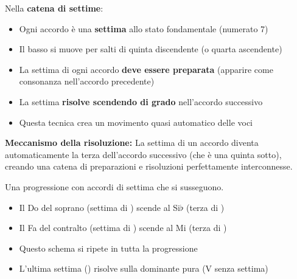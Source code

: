 \begin{regola}
	\label{reg:progressione_7}
	Nella \textbf{catena di settime}:
	
	\begin{itemize}
		\item Ogni accordo è una \textbf{settima} allo stato fondamentale (numerato 7)
		\item Il basso si muove per salti di quinta discendente (o quarta ascendente)
		\item La settima di ogni accordo \textbf{deve essere preparata} (apparire come consonanza nell'accordo precedente)
		\item La settima \textbf{risolve scendendo di grado} nell'accordo successivo
		\item Questa tecnica crea un movimento quasi automatico delle voci
	\end{itemize}
	
	\textbf{Meccanismo della risoluzione:}
	La settima di un accordo diventa automaticamente la terza dell'accordo successivo (che è una quinta sotto), creando una catena di preparazioni e risoluzioni perfettamente interconnesse.
\end{regola}

\begin{esempio}
	\label{ex:catena_settime}
	Una progressione con accordi di settima che si susseguono.
	\begin{itemize}
		\item Il Do del soprano (settima di ) scende al Si$\flat$ (terza di )
		\item Il Fa del contralto (settima di ) scende al Mi (terza di )
		\item Questo schema si ripete in tutta la progressione
		\item L'ultima settima () risolve sulla dominante pura (V senza settima)
	\end{itemize}
\end{esempio}

